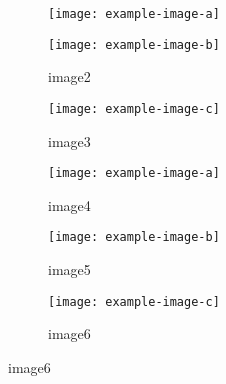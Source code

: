 \documentclass[a4paper,landscape]{article}
\begin{document}
\begin{figure}[htb]
    \centering %
\begin{subfigure}{0.25\textwidth}
  \texttt{[image: example-image-a]}
  \label{fig:1}
\end{subfigure}\hfil %
\begin{subfigure}{0.25\textwidth}
  \texttt{[image: example-image-b]}
  \caption{image2}
  \label{fig:2}
\end{subfigure}\hfil %
\begin{subfigure}{0.25\textwidth}
  \texttt{[image: example-image-c]}
  \caption{image3}
  \label{fig:3}
\end{subfigure}

\medskip
\begin{subfigure}{0.25\textwidth}
  \texttt{[image: example-image-a]}
  \caption{image4}
  \label{fig:4}
\end{subfigure}\hfil %
\begin{subfigure}{0.25\textwidth}
  \texttt{[image: example-image-b]}
  \caption{image5}
  \label{fig:5}
\end{subfigure}\hfil %
\begin{subfigure}{0.25\textwidth}
  \texttt{[image: example-image-c]}
  \caption{image6}
  \label{fig:6}
\end{subfigure}

\end{figure}
\end{document}
